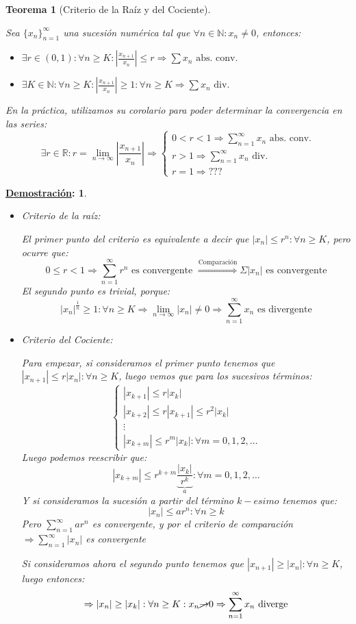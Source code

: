 \documentclass[10pt,a4paper,openright]{book}
\theoremstyle{break}
\newtheorem*{theo}{Teorema}
\newtheorem*{demo}{\underline{Demostración}:}
\begin{document}
\begin{theo}[Criterio de la Raíz y del Cociente]
\begin{itemize}
	Sea $\{x_n\}_{n=1}^\infty$ una sucesión numérica tal que $\forall n \in \mathbb{N} : x_n \neq 0$, entonces:
	\begin{itemize}
	\item $\exists r\in (0,1): \forall n\geq K: \left|\frac{x_{n+1}}{x_n}\right| \leq r \Rightarrow \sum x_n \mbox{ abs. conv. }$
	\item $\exists K \in \mathbb N: \forall n\geq K: \left|\frac{x_{n+1}}{x_n}\right| \geq 1 : \forall n \geq K \Rightarrow \sum x_n \mbox{ div. } $
	\end{itemize}
	En la práctica, utilizamos su corolario para poder determinar la convergencia en las series:
	$$\exists r\in \mathbb R: r = \lim_{n \rightarrow \infty} \left|\frac{x_{n+1}}{x_n}\right|\Rightarrow \begin{cases} 0<r<1 \Rightarrow \sum_{n=1}^{\infty} x_n \mbox{ abs. conv.} \\ r>1 \Rightarrow  \sum_{n=1}^{\infty} x_n \mbox{ div. } \\ r = 1 \Rightarrow ??? \end{cases}	$$
\end{itemize}
\end{theo}
\begin{demo}
\begin{itemize}
\item Criterio de la raíz:

El primer punto del criterio es equivalente a decir que $|x_n| \leq r^n : \forall n \geq K$, pero ocurre que:
$$0 \leq r < 1 \Rightarrow \sum_{n=1}^{\infty} r^n \mbox{ es convergente }\overset{\mbox{Comparación}}{\Rightarrow} \Sigma |x_n| \mbox{ es convergente}$$
El segundo punto es trivial, porque:
$$|x_n|^{\frac{1}{n}} \geq 1 : \forall n \geq K \Rightarrow \lim_{n \to  \infty} |x_n| \neq 0 \Rightarrow \sum_{n=1}^\infty x_n \mbox{ es divergente}$$

\item Criterio del Cociente:

Para empezar, si consideramos el primer punto tenemos que $ |x_{n+1} | \leq r |x_n|: \forall n \geq K $, luego vemos que para los sucesivos términos:
$$\begin{cases}|x_{k+1}| \leq r |x_k| \\ |x_{k+2}|\leq r |x_{k+1}| \leq r^2 |x_k| \\ \vdots \\ |x_{k+m}| \leq r^m |x_k| : \forall m = 0,1,2,\ldots \end{cases}$$
Luego podemos reescribir que:
$$|x_{k+m}| \leq r^{k+m} \underbrace{\frac{|x_k|}{r^k}}_a : \forall m = 0,1,2,\ldots$$
Y si consideramos la sucesión a partir del término $k-esimo$ tenemos que:
$$|x_n| \leq a r^n : \forall n \geq k$$
Pero $\sum_{n=1}^{\infty} a r^n$ es convergente, y por el criterio de comparación $\Rightarrow \sum_{n=1}^{\infty} |x_n|$ es convergente

Si consideramos ahora el segundo punto tenemos que $|x_{n+1}| \geq |x_n|: \forall n \geq K $, luego entonces:
$$\Rightarrow |x_n| \geq |x_k|: \forall n \geq K: x_n \cancel{\rightarrow} 0 \Rightarrow  \sum_{n=1}^\infty x_n \mbox{ diverge}$$
\end{itemize}
\end{demo}
\end{document}

